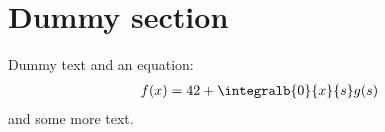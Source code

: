 





\section{Dummy section}
Dummy text and an equation:
\begin{align}
    f(x) = 42 + \integralb{0}{x}{s} g(s)
\end{align}
and some more text.




